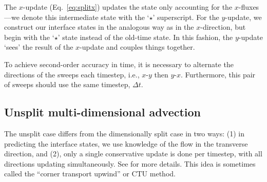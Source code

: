 The $x$-update
(Eq.~\ref{eq:splitx}) updates the state only accounting for the
$x$-fluxes---we denote this intermediate state with the `$\star$'
superscript.  For the $y$-update, we construct our interface states in
the analogous way as in the $x$-direction, but begin with the `$\star$'
state instead of the old-time state.  In this fashion, the $y$-update
`sees' the result of the $x$-update and couples things together.

To achieve second-order accuracy in time, it is necessary to alternate
the directions of the sweeps each timestep, i.e., $x$-$y$ then $y$-$x$.
Furthermore, this pair of sweeps should use the same timestep, $\Delta t$.


\subsection{Unsplit multi-dimensional advection}

The unsplit case differs from the dimensionally split case in two
ways: (1) in predicting the interface states, we use knowledge of the
flow in the transverse direction, and (2), only a single conservative
update is done per timestep, with all directions updating
simultaneously.  See \cite{colella:1990} for more details.  This idea
is sometimes called the ``corner transport upwind'' or CTU method.

